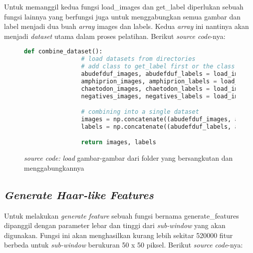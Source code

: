 	Untuk memanggil kedua fungsi load\_images dan get\_label diperlukan sebuah fungsi lainnya 
	yang berfungsi juga untuk menggabungkan semua gambar dan label menjadi dua buah \emph{array} 
	images dan labels. Kedua \emph{array} ini nantinya akan menjadi \textit{dataset} utama 
	dalam proses pelatihan. Berikut \emph{source code}-nya:

	\begin{figure}[H]
		\begin{lstlisting}[language=Python, basicstyle=\tiny]
			def combine_dataset():
				# load datasets from directories
				# add class to get_label first or the class will be considered a negative example
				abudefduf_images, abudefduf_labels = load_images("fish_dataset\\abudefduf")
				amphiprion_images, amphiprion_labels = load_images("fish_dataset\\amphiprion")
				chaetodon_images, chaetodon_labels = load_images("fish_dataset\\chaetodon")
				negatives_images, negatives_labels = load_images("fish_dataset\\negative_examples")

				# combining into a single dataset
				images = np.concatenate((abudefduf_images, amphiprion_images, chaetodon_images, negatives_images), axis = 0)
				labels = np.concatenate((abudefduf_labels, amphiprion_labels, chaetodon_labels, negatives_labels), axis = 0)

				return images, labels
		\end{lstlisting}
		\caption{\emph{source code:} \textit{load} gambar-gambar dari folder yang bersangkutan dan 
		menggabungkannya}
		\label{code:conc dataset}
	\end{figure}

\subsection{\textit{Generate Haar-like Features}}
	Untuk melakukan \emph{generate feature} sebuah fungsi bernama generate\_features dipanggil 
	dengan parameter lebar dan tinggi dari \emph{sub-window} yang akan digunakan. Fungsi ini akan 
	menghasilkan kurang lebih sekitar 520000 fitur berbeda untuk \emph{sub-window} berukuran 
	50 x 50 piksel. Berikut \emph{source code}-nya:

